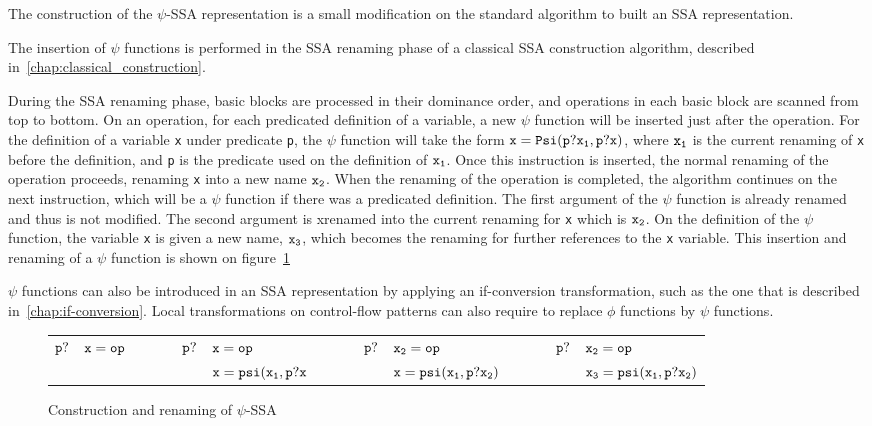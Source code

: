 
The construction of the $\psi$-SSA representation is a small
modification on the standard algorithm to built an SSA representation.

The insertion of $\psi$ functions is performed in the SSA renaming
phase of a classical SSA construction algorithm, described
in~\ref{chap:classical_construction}.

During the SSA renaming phase, basic blocks are processed in their
dominance order, and operations in each basic block are scanned from
top to bottom. On an operation, for each predicated definition of a
variable, a new $\psi$ function will be inserted just after the
operation. For the definition of a variable {\tt x} under predicate
{\tt p}, the $\psi$ function will take the form ${\tt x = Psi(p?x_1,
  p?x)}$, where ${\tt x_1}$ is the current renaming of {\tt x} before
the definition, and {\tt p} is the predicate used on the definition of
${\tt x_1}$. Once this instruction is inserted, the normal renaming of
the operation proceeds, renaming {\tt x} into a new name ${\tt
  x_2}$. When the renaming of the operation is completed, the
algorithm continues on the next instruction, which will be a $\psi$
function if there was a predicated definition. The first argument of
the $\psi$ function is already renamed and thus is not modified. The
second argument is xrenamed into the current renaming for {\tt x}
which is ${\tt x_2}$. On the definition of the $\psi$ function, the
variable {\tt x} is given a new name, ${\tt x_3}$, which becomes the
renaming for further references to the {\tt x} variable. This
insertion and renaming of a $\psi$ function is shown on
figure~\ref{fig:psi_ssa_construct}

$\psi$ functions can also be introduced in an SSA representation by
applying an if-conversion transformation, such as the one that is
described in~\ref{chap:if-conversion}. Local transformations on
control-flow patterns can also require to replace $\phi$ functions by
$\psi$ functions.

\begin{figure}
\begin{center}
\footnotesize
\begin{tabular}{lllllllllll}
${\tt p?}$ & ${\tt x = op}$ & \ \ \ \  & ${\tt p?}$ & ${\tt x = op}$           & \ \ \ \  & ${\tt p?}$ & ${\tt x_2 = op}$           & \ \ \ \  & ${\tt p?}$ & ${\tt x_2 = op}$ \\
           &                &          &            & ${\tt x = psi(x_1, p?x}$ &           &           & ${\tt x = psi(x_1, p?x_2)}$ &          &           & ${\tt x_3 = psi(x_1, p?x_2)}$ \\
\end{tabular}
\caption{Construction and renaming of $\psi$-SSA}
\label{fig:psi_ssa_construct}
\end{center}
\end{figure}


